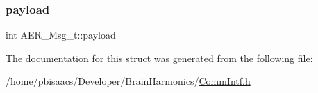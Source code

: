 \mbox{\label{structAER__Msg__t_a6ad37487067cdec83aba923dbfecd043}} 
\subsubsection{\texorpdfstring{payload}{payload}}
{\footnotesize\ttfamily int A\+E\+R\+\_\+\+Msg\+\_\+t\+::payload}



The documentation for this struct was generated from the following file\+:\begin{DoxyCompactItemize}
\item 
/home/pbisaacs/\+Developer/\+Brain\+Harmonics/\mbox{\hyperlink{CommIntf_8h}{Comm\+Intf.\+h}}\end{DoxyCompactItemize}
